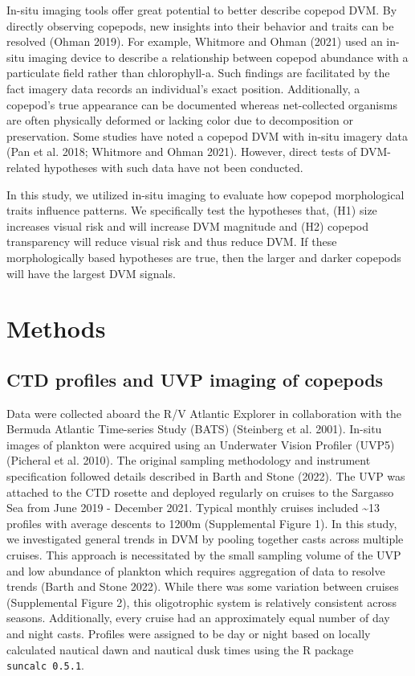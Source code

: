 \documentclass[
  letterpaper,
  DIV=11,
  numbers=noendperiod]{scrartcl}
\begin{document}
In-situ imaging tools offer great potential to better describe copepod
DVM. By directly observing copepods, new insights into their behavior
and traits can be resolved (Ohman 2019). For example, Whitmore and Ohman
(2021) used an in-situ imaging device to describe a relationship between
copepod abundance with a particulate field rather than chlorophyll-a.
Such findings are facilitated by the fact imagery data records an
individual's exact position. Additionally, a copepod's true appearance
can be documented whereas net-collected organisms are often physically
deformed or lacking color due to decomposition or preservation. Some
studies have noted a copepod DVM with in-situ imagery data (Pan et al.
2018; Whitmore and Ohman 2021). However, direct tests of DVM-related
hypotheses with such data have not been conducted.

In this study, we utilized in-situ imaging to evaluate how copepod
morphological traits influence patterns. We specifically test the
hypotheses that, (H1) size increases visual risk and will increase DVM
magnitude and (H2) copepod transparency will reduce visual risk and thus
reduce DVM. If these morphologically based hypotheses are true, then the
larger and darker copepods will have the largest DVM signals.

\hypertarget{methods}{%
\section{Methods}\label{methods}}

\hypertarget{ctd-profiles-and-uvp-imaging-of-copepods}{%
\subsection{CTD profiles and UVP imaging of
copepods}\label{ctd-profiles-and-uvp-imaging-of-copepods}}

Data were collected aboard the R/V Atlantic Explorer in collaboration
with the Bermuda Atlantic Time-series Study (BATS) (Steinberg et al.
2001). In-situ images of plankton were acquired using an Underwater
Vision Profiler (UVP5) (Picheral et al. 2010). The original sampling
methodology and instrument specification followed details described in
Barth and Stone (2022). The UVP was attached to the CTD rosette and
deployed regularly on cruises to the Sargasso Sea from June 2019 -
December 2021. Typical monthly cruises included \textasciitilde13
profiles with average descents to 1200m (Supplemental Figure 1). In this
study, we investigated general trends in DVM by pooling together casts
across multiple cruises. This approach is necessitated by the small
sampling volume of the UVP and low abundance of plankton which requires
aggregation of data to resolve trends (Barth and Stone 2022). While
there was some variation between cruises (Supplemental Figure 2), this
oligotrophic system is relatively consistent across seasons.
Additionally, every cruise had an approximately equal number of day and
night casts. Profiles were assigned to be day or night based on locally
calculated nautical dawn and nautical dusk times using the R package
\texttt{suncalc\ 0.5.1}.
\end{document}

